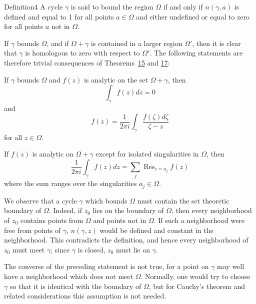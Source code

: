 \begin{originalstatement}{Definition}{4}\label{def:4.4}
A cycle $\gamma$ is said to bound the region $\Omega$ if and only if $n(\gamma, a)$ is defined and equal to 1 for all points $a \in \Omega$ and either undefined or equal to zero for all points $a$ not in $\Omega$.
\end{originalstatement}
If $\gamma$ bounds $\Omega$, and if $\Omega + \gamma$ is contained in a larger region $\Omega'$, then it is clear that $\gamma$ is homologous to zero with respect to $\Omega'$. The following statements are therefore trivial consequences of Theorems~\hyperref[thm:4.15]{15} and \hyperref[thm:4.17]{17}:

\begin{originalassertion}
If $\gamma$ bounds $\Omega$ and $f(z)$ is analytic on the set $\Omega +\gamma$, then
\begin{equation*}
\int_ {\gamma} f (z) d z = 0
\end{equation*}
and
\begin{equation*}
f (z) = \frac {1}{2 \pi i} \int_ {\gamma} \frac {f (\zeta) d \zeta}{\zeta - z}
\end{equation*}
for all $z \in \Omega$.
\end{originalassertion}


\begin{originalassertion}
If $f(z)$ is analytic on $\Omega + \gamma$ except for isolated singularities in $\Omega$, then
\begin{equation*}
\frac {1}{2 \pi i} \int_ {\gamma} f (z) d z = \sum_ {j} \operatorname{Res} _ {z = a _ {j}} f (z)
\end{equation*}
where the sum ranges over the singularities $a_{j} \in \Omega$.
\end{originalassertion}

We observe that a cycle $\gamma$ which bounds $\Omega$ must contain the set theoretic boundary of $\Omega$. Indeed, if $z_{0}$ lies on the boundary of $\Omega$, then every neighborhood of $z_{0}$ contains points from $\Omega$ and points not in $\Omega$. If such a neighborhood were free from points of $\gamma$, $n(\gamma,z)$ would be defined and constant in the neighborhood. This contradicts the definition, and hence every neighborhood of $z_{0}$ must meet $\gamma$; since $\gamma$ is closed, $z_{0}$ must lie on $\gamma$.

The converse of the preceding statement is not true, for a point on $\gamma$ may well have a neighborhood which does not meet $\Omega$. Normally, one would try to choose $\gamma$ so that it is identical with the boundary of $\Omega$, but for Cauchy's theorem and related considerations this assumption is not needed.

